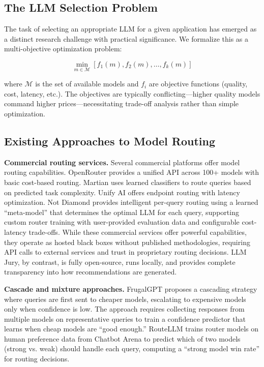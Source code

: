 \documentclass[11pt,a4paper]{article}
\begin{document}
\subsection{The LLM Selection Problem}

The task of selecting an appropriate LLM for a given application has emerged as a distinct research challenge with practical significance. We formalize this as a multi-objective optimization problem:

\begin{equation}
\min_{m \in \mathcal{M}} \left[ f_1(m), f_2(m), \ldots, f_k(m) \right]
\end{equation}

where $\mathcal{M}$ is the set of available models and $f_i$ are objective functions (quality, cost, latency, etc.). The objectives are typically conflicting---higher quality models command higher prices---necessitating trade-off analysis rather than simple optimization.

\subsection{Existing Approaches to Model Routing}

\textbf{Commercial routing services.} Several commercial platforms offer model routing capabilities. OpenRouter \cite{openrouter2024} provides a unified API across 100+ models with basic cost-based routing. Martian \cite{martian2024} uses learned classifiers to route queries based on predicted task complexity. Unify AI \cite{unify2024} offers endpoint routing with latency optimization. Not Diamond \cite{notdiamond2024} provides intelligent per-query routing using a learned ``meta-model'' that determines the optimal LLM for each query, supporting custom router training with user-provided evaluation data and configurable cost-latency trade-offs. While these commercial services offer powerful capabilities, they operate as hosted black boxes without published methodologies, requiring API calls to external services and trust in proprietary routing decisions. LLM Jury, by contrast, is fully open-source, runs locally, and provides complete transparency into how recommendations are generated.

\textbf{Cascade and mixture approaches.} FrugalGPT \cite{chen2023frugalgpt} proposes a cascading strategy where queries are first sent to cheaper models, escalating to expensive models only when confidence is low. The approach requires collecting responses from multiple models on representative queries to train a confidence predictor that learns when cheap models are ``good enough.'' RouteLLM \cite{routellm2024} trains router models on human preference data from Chatbot Arena to predict which of two models (strong vs. weak) should handle each query, computing a ``strong model win rate'' for routing decisions.
\end{document}

